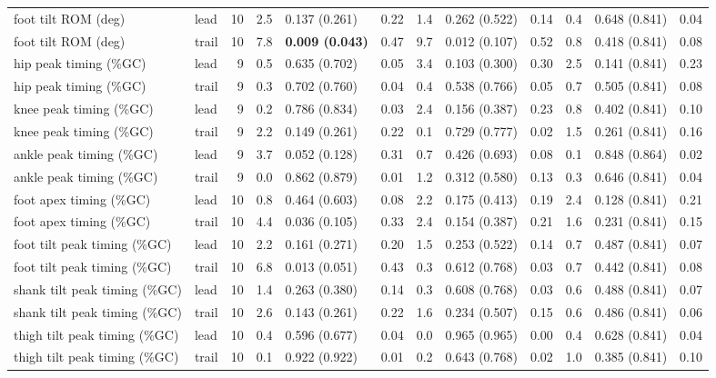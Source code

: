 \begin{adjustbox}{max width=\textwidth}
{\begin{tabular}{llrrlrrlrrlr}
foot tilt ROM (deg) & lead & 10 & 2.5 & 0.137 (0.261) & 0.22 & 1.4 & 0.262 (0.522) & 0.14 & 0.4 & 0.648 (0.841) & 0.04 \\
foot tilt ROM (deg) & trail & 10 & 7.8 & \textbf{0.009 (0.043)} & 0.47 & 9.7 & 0.012 (0.107) & 0.52 & 0.8 & 0.418 (0.841) & 0.08 \\
hip peak timing (\%GC) & lead & 9 & 0.5 & 0.635 (0.702) & 0.05 & 3.4 & 0.103 (0.300) & 0.30 & 2.5 & 0.141 (0.841) & 0.23 \\
hip peak timing (\%GC) & trail & 9 & 0.3 & 0.702 (0.760) & 0.04 & 0.4 & 0.538 (0.766) & 0.05 & 0.7 & 0.505 (0.841) & 0.08 \\
knee peak timing (\%GC) & lead & 9 & 0.2 & 0.786 (0.834) & 0.03 & 2.4 & 0.156 (0.387) & 0.23 & 0.8 & 0.402 (0.841) & 0.10 \\
knee peak timing (\%GC) & trail & 9 & 2.2 & 0.149 (0.261) & 0.22 & 0.1 & 0.729 (0.777) & 0.02 & 1.5 & 0.261 (0.841) & 0.16 \\
ankle peak timing (\%GC) & lead & 9 & 3.7 & 0.052 (0.128) & 0.31 & 0.7 & 0.426 (0.693) & 0.08 & 0.1 & 0.848 (0.864) & 0.02 \\
ankle peak timing (\%GC) & trail & 9 & 0.0 & 0.862 (0.879) & 0.01 & 1.2 & 0.312 (0.580) & 0.13 & 0.3 & 0.646 (0.841) & 0.04 \\
foot apex timing (\%GC) & lead & 10 & 0.8 & 0.464 (0.603) & 0.08 & 2.2 & 0.175 (0.413) & 0.19 & 2.4 & 0.128 (0.841) & 0.21 \\
foot apex timing (\%GC) & trail & 10 & 4.4 & 0.036 (0.105) & 0.33 & 2.4 & 0.154 (0.387) & 0.21 & 1.6 & 0.231 (0.841) & 0.15 \\
foot tilt peak timing (\%GC) & lead & 10 & 2.2 & 0.161 (0.271) & 0.20 & 1.5 & 0.253 (0.522) & 0.14 & 0.7 & 0.487 (0.841) & 0.07 \\
foot tilt peak timing (\%GC) & trail & 10 & 6.8 & 0.013 (0.051) & 0.43 & 0.3 & 0.612 (0.768) & 0.03 & 0.7 & 0.442 (0.841) & 0.08 \\
shank tilt peak timing (\%GC) & lead & 10 & 1.4 & 0.263 (0.380) & 0.14 & 0.3 & 0.608 (0.768) & 0.03 & 0.6 & 0.488 (0.841) & 0.07 \\
shank tilt peak timing (\%GC) & trail & 10 & 2.6 & 0.143 (0.261) & 0.22 & 1.6 & 0.234 (0.507) & 0.15 & 0.6 & 0.486 (0.841) & 0.06 \\
thigh tilt peak timing (\%GC) & lead & 10 & 0.4 & 0.596 (0.677) & 0.04 & 0.0 & 0.965 (0.965) & 0.00 & 0.4 & 0.628 (0.841) & 0.04 \\
thigh tilt peak timing (\%GC) & trail & 10 & 0.1 & 0.922 (0.922) & 0.01 & 0.2 & 0.643 (0.768) & 0.02 & 1.0 & 0.385 (0.841) & 0.10 \\

\end{tabular}}
\end{adjustbox}
